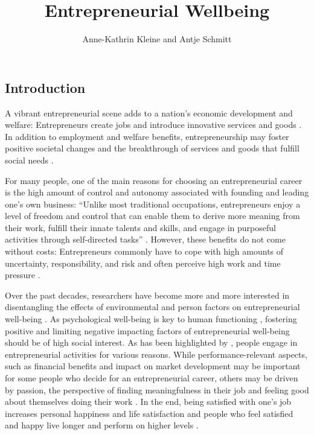 \documentclass[a4paper,man,natbib]{apa6}
\title{Entrepreneurial Wellbeing}
\author{Anne-Kathrin Kleine and Antje Schmitt}
\affiliation{University of Groningen}
\begin{document}
\abstract 

\maketitle

\subsection{Introduction}
A vibrant entrepreneurial scene adds to a nation’s economic development and welfare: Entrepreneurs create jobs and introduce innovative services and goods \citep{Acs.1988, Schumpeter.1934}. In addition to employment and welfare benefits, entrepreneurship may foster positive societal changes and the breakthrough of services and goods that fulfill social needs \cite[e.g.][]{Certo2008, Stephan2018, Wiklund2019}. \par 
For many people, one of the main reasons for choosing an entrepreneurial career is the high amount of control and autonomy associated with founding and leading one's own business: “Unlike most traditional occupations, entrepreneurs enjoy a level of freedom and control that can enable them to derive more meaning from their work, fulfill their innate talents and skills, and engage in purposeful activities through self-directed tasks” \cite[p.~580] {Wiklund2019}. However, these benefits do not come without costs: Entrepreneurs commonly have to cope with high amounts of uncertainty, responsibility, and risk and often perceive high work and time pressure \citep{Stephan2018}.  \par
Over the past decades, researchers have become more and more interested in disentangling the effects of environmental and person factors on entrepreneurial well-being \cite[e.g.][]{Stephan.2018, Shir.2019, Carter2011, Baron2008}. As psychological well-being is key to human functioning \citep{Aldwin1987}, fostering positive and limiting negative impacting factors of entrepreneurial well-being should be of high social interest. As has been highlighted by \cite{Wiklund2019}, people engage in entrepreneurial activities for various reasons. While performance-relevant aspects, such as financial benefits and impact on market development may be important for some people who decide for an entrepreneurial career, others may be driven by passion, the perspective of finding meaningfulness in their job and feeling good about themselves doing their work \citep[e.g.][]{Cardon2008, Aguinis2019}. In the end, being satisfied with one's job increases personal happiness and life satisfaction \cite[e.g.][]{WEAVER1978, Unanue2017} and people who feel satisfied and happy live longer \citep{Diener2011} and perform on higher levels \citep{VanDeVoorde2012}. \par
\end{document}
